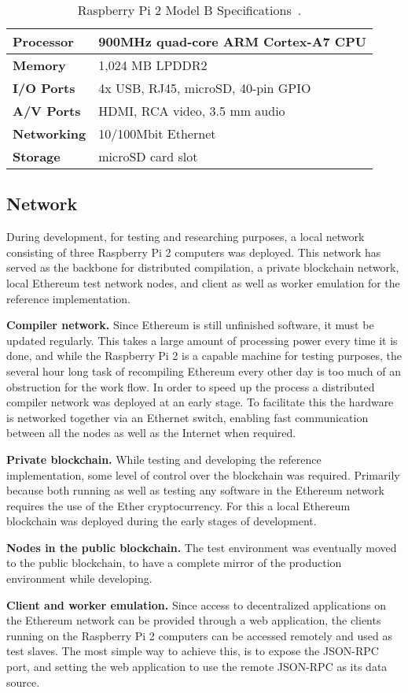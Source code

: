 \begin{table}[h]
\centering
\caption{Raspberry Pi 2 Model B Specifications~\cite{rpi}.}
\label{rpi}
\begin{tabular}{|l|l|}
\hline \textbf{Processor} & 900MHz quad-core ARM Cortex-A7 CPU \\ \hline
\textbf{Memory} & 1,024 MB LPDDR2 \\ \hline 
\textbf{I/O Ports} & 4x USB, RJ45, microSD, 40-pin GPIO \\ \hline
\textbf{A/V Ports} & HDMI, RCA video, 3.5 mm audio \\ \hline
\textbf{Networking} & 10/100Mbit Ethernet \\ \hline
\textbf{Storage} & microSD card slot \\ \hline
\end{tabular}
\end{table}

\subsection{Network}
During development, for testing and researching purposes, a local network consisting of three Raspberry Pi 2 computers was deployed. This network has served as the backbone for distributed compilation, a private blockchain network, local Ethereum test network nodes, and client as well as worker emulation for the reference implementation.

\textbf{Compiler network.} Since Ethereum is still unfinished software, it must be updated regularly. This takes a large amount of processing power every time it is done, and while the Raspberry Pi 2 is a capable machine for testing purposes, the several hour long task of recompiling Ethereum every other day is too much of an obstruction for the work flow. In order to speed up the process a distributed compiler network was deployed at an early stage. To facilitate this the hardware is networked together via an Ethernet switch, enabling fast communication between all the nodes as well as the Internet when required. 

\textbf{Private blockchain.} While testing and developing the reference implementation, some level of control over the blockchain was required. Primarily because both running as well as testing any software in the Ethereum network requires the use of the Ether cryptocurrency. For this a local Ethereum blockchain was deployed during the early stages of development.

\textbf{Nodes in the public blockchain.} The test environment was eventually moved to the public blockchain, to have a complete mirror of the production environment while developing.

\textbf{Client and worker emulation.} Since access to decentralized applications on the Ethereum network can be provided through a web application, the clients running on the Raspberry Pi 2 computers can be accessed remotely and used as test slaves. The most simple way to achieve this, is to expose the JSON-RPC port, and setting the web application to use the remote JSON-RPC as its data source.
